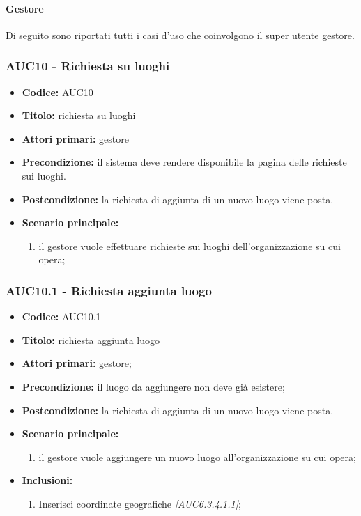 \documentclass[casi-duso]{subfiles}
\begin{document}
\paragraph{Gestore}
Di seguito sono riportati tutti i casi d'uso che coinvolgono il super utente gestore.

\subsubsection{AUC10 - Richiesta su luoghi}%
\label{subsub:AUC10}
\begin{itemize}
  \item \textbf{Codice:} AUC10
  \item \textbf{Titolo:} richiesta su luoghi
  \item \textbf{Attori primari:} gestore
  \item \textbf{Precondizione:} il sistema deve rendere disponibile la pagina delle richieste sui luoghi.
  \item \textbf{Postcondizione:} la richiesta di aggiunta di un nuovo luogo viene posta.
  \item \textbf{Scenario principale:}
  \begin{enumerate}
    \item il gestore vuole effettuare richieste sui luoghi dell'organizzazione su cui opera;
  \end{enumerate}
\end{itemize}

\subsubsection{AUC10.1 - Richiesta aggiunta luogo}%
\label{subsub:AUC10.1}
\begin{itemize}
  \item \textbf{Codice:} AUC10.1
  \item \textbf{Titolo:} richiesta aggiunta luogo
  \item \textbf{Attori primari:} gestore;
  \item \textbf{Precondizione:} il luogo da aggiungere non deve già esistere;
  \item \textbf{Postcondizione:} la richiesta di aggiunta di un nuovo luogo viene posta.
  \item \textbf{Scenario principale:}
  \begin{enumerate}
    \item il gestore vuole aggiungere un nuovo luogo all'organizzazione su cui opera;
  \end{enumerate}
  \item \textbf{Inclusioni:}
  \begin{enumerate}
    \item Inserisci coordinate geografiche \emph{[AUC6.3.4.1.1]};
  \end{enumerate}
\end{itemize}
\end{document}
